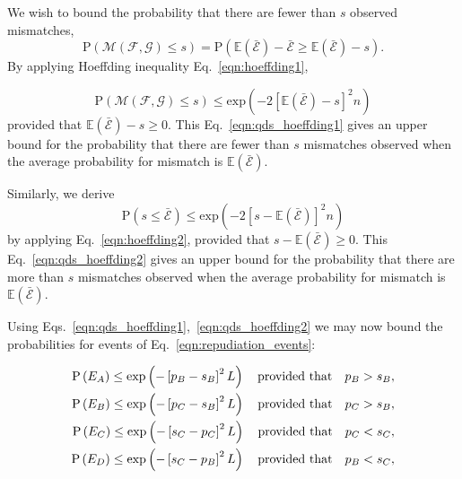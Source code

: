 \noindent We wish to bound the probability that there are fewer than $s$ observed mismatches,
\begin{equation}
\text{P}\left(\mathcal{M}\left(\mathcal{F}, \mathcal{G}\right) \le s\right) = \text{P}\left( \mathbb{E}\left(\bar{\mathcal{E}}\right) - \bar{\mathcal{E}} \ge \mathbb{E}\left(\bar{\mathcal{E}}\right) - s\right).
\end{equation}
By applying Hoeffding inequality Eq.~\ref{eqn:hoeffding1},

\begin{equation}\label{eqn:qds_hoeffding1}
\text{P}\left(\mathcal{M}\left(\mathcal{F}, \mathcal{G}\right) \le s \right) \le \text{exp}\left(- 2 \left[\mathbb{E}\left(\bar{\mathcal{E}}\right) - s\right]^2 n \right)
\end{equation}
provided that $\mathbb{E}\left(\bar{\mathcal{E}}\right) - s \ge 0$. This Eq.~\ref{eqn:qds_hoeffding1} gives an upper bound for the probability that there are fewer than $s$ mismatches observed when the average probability for mismatch is $\mathbb{E}\left(\bar{\mathcal{E}}\right)$.

Similarly, we derive
\begin{equation}\label{eqn:qds_hoeffding2}
\text{P}\left(s \le \bar{\mathcal{E}}\right) \le \text{exp}\left( - 2 \left[s - \mathbb{E}\left(\bar{\mathcal{E}}\right)\right]^2 n\right)
\end{equation}
by applying Eq.~\ref{eqn:hoeffding2}, provided that $s - \mathbb{E}\left(\bar{\mathcal{E}}\right) \ge 0$. This Eq.~\ref{eqn:qds_hoeffding2} gives an upper bound for the probability that there are more than $s$ mismatches observed when the average probability for mismatch is $\mathbb{E}\left(\bar{\mathcal{E}}\right)$. 


Using Eqs.~\ref{eqn:qds_hoeffding1},~\ref{eqn:qds_hoeffding2} we may now bound the probabilities for events of Eq.~\ref{eqn:repudiation_events}:

\begin{align}\label{eqn:qds_repudiation_events_probs}
\text{P}\left(E_A\right) \le \text{exp}\left( -\left[p_B - s_B\right]^2 L \right) \qq{provided that} p_B > s_B, \notag \\
\text{P}\left(E_B\right) \le \text{exp}\left( -\left[p_C - s_B\right]^2 L \right) \qq{provided that} p_C > s_B, \notag \\
\text{P}\left(E_C\right) \le \text{exp}\left( -\left[s_C - p_C\right]^2 L \right) \qq{provided that} p_C < s_C, \notag \\
\text{P}\left(E_D\right) \le \text{exp}\left( -\left[s_C - p_B\right]^2 L \right) \qq{provided that} p_B < s_C,
\end{align}

